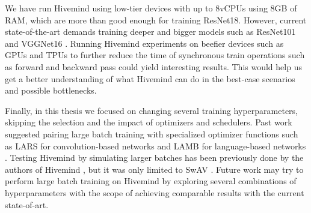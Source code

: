 We have run Hivemind using low-tier devices with up to 8vCPUs using 8GB of RAM, which are more than good enough for training ResNet18.
However, current state-of-the-art demands training deeper and bigger models such as ResNet101 and VGGNet16 \cite{10.48550/arxiv.1409.1556}.
Running Hivemind experiments on beefier devices such as GPUs and TPUs to further reduce the time of synchronous train operations such as forward and backward pass could yield interesting results.
This would help us get a better understanding of what Hivemind can do in the best-case scenarios and possible bottlenecks.

Finally, in this thesis we focused on changing several training hyperparameters, skipping the selection and the impact of optimizers and schedulers.
Past work suggested pairing large batch training with specialized optimizer functions such as LARS for convolution-based networks \cite{you2017scaling, DBLP:journals/corr/KeskarMNST16} and LAMB for language-based networks \cite{DBLP:journals/corr/abs-1904-00962}.
Testing Hivemind by simulating larger batches has been previously done by the authors of Hivemind \cite{DBLP:journals/corr/abs-2106-10207}, but it was only limited to SwAV \cite{DBLP:journals/corr/abs-2006-09882}.
Future work may try to perform large batch training on Hivemind by exploring several combinations of hyperparameters with the scope of achieving comparable results with the current state-of-art.
